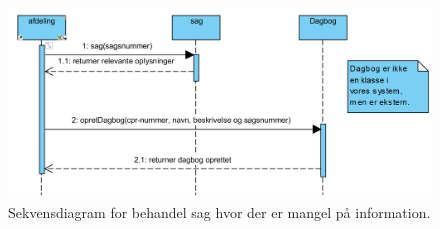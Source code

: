 \begin{figure}[hbt!]
  \includegraphics[width=\linewidth]{./PNG/sekDiaAfgoereSagsbehandOpret.PNG} 
  \caption{Sekvensdiagram for behandel sag hvor der er mangel på information.}
  \label{fig:ASOpret}
\end{figure}
\newpage

